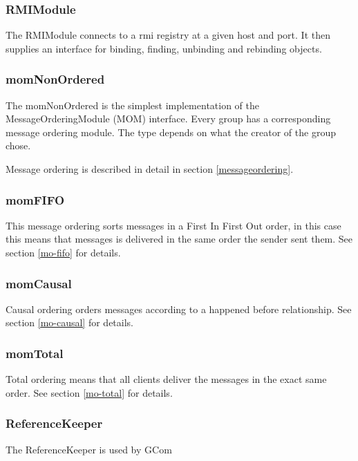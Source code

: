 \documentclass[english]{article}
\begin{document}
\subsubsection{RMIModule}
The RMIModule connects to a rmi registry at a given host and port. It then supplies an interface for binding, finding, unbinding and rebinding objects.

\subsubsection{momNonOrdered}
The momNonOrdered is the simplest implementation of the MessageOrderingModule (MOM) interface. Every group has a corresponding message ordering module. The type depends on what the creator of the group chose. 

Message ordering is described in detail in section \vref{messageordering}.

\subsubsection{momFIFO}
This message ordering sorts messages in a First In First Out order, in this case this means that messages is delivered in the same order the sender sent them. See section \vref{mo-fifo} for details.

\subsubsection{momCausal}
Causal ordering orders messages according to a happened before relationship. See section \vref{mo-causal} for details.

\subsubsection{momTotal}
Total ordering means that all clients deliver the messages in the exact same order. See section \vref{mo-total} for details.

\subsubsection{ReferenceKeeper}
The ReferenceKeeper is used by GCom 
\end{document}
